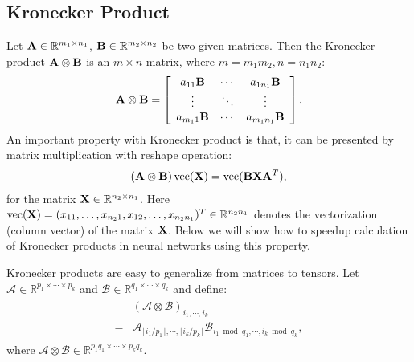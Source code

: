 \documentclass{article}
\def\A{{\bf A}}
\def\B{{\bf B}}
\def\X{{\bf X}}
\def\RB{{\mathbb R}}
\def\vect{\operatorname{vec}}
\begin{document}
\subsection{Kronecker Product}
Let $\A \in \RB^{m_1\times n_1}$, $\B\in \RB^{m_2\times n_2}$ be two given matrices. Then the Kronecker product $\A \otimes \B$
is an $m \times n$ matrix, where $m=m_1m_2, n=n_1n_2$:
\begin{eqnarray}
\A \otimes \B = \left[\begin{array}{ccc}
a_{11}\B & \cdots & a_{1n_1}\B \\
\vdots & \ddots & \vdots \\
a_{m_11}\B & \cdots & a_{m_1n_1}\B
\end{array} \right].
\end{eqnarray}
An important property with Kronecker product is that, it can be presented by matrix multiplication with reshape operation:
\begin{eqnarray}
\label{vectorization}
(\A\otimes\B)\vect(\X) = \vect(\B \X \A^{T}),
\end{eqnarray}
for  the matrix $\X \in \RB^{n_2 \times n_1}$. Here  $\vect(\X) =(x_{11}, \ldots, x_{n_2 1}, x_{12}, \ldots, x_{n_2 n_1})^T \in \RB^{n_2 n_1}$ denotes the vectorization (column vector) of the matrix $\X$. Below we will show how to speedup calculation of Kronecker products in neural networks using this property.

Kronecker products are easy to generalize from matrices to tensors. Let $\mathcal{A} \in \RB^{p_1 \times \cdots \times p_k}$ and $\mathcal{B} \in \RB^{q_1 \times \cdots \times q_k}$ and define:
\begin{align}
\begin{split}
&(\mathcal{A}\otimes\mathcal{B})_{i_1,\cdots,i_k} \\
=& \mathcal{A}_{\lfloor i_1/p_1 \rfloor, \cdots, \lfloor i_k/p_k \rfloor} \mathcal{B}_{i_1\bmod q_1, \cdots, i_k\bmod q_k},
\end{split}
\end{align}
where $\mathcal{A}\otimes\mathcal{B} \in \RB^{p_1q_1\times\cdots\times p_kq_k}$.
\end{document}
